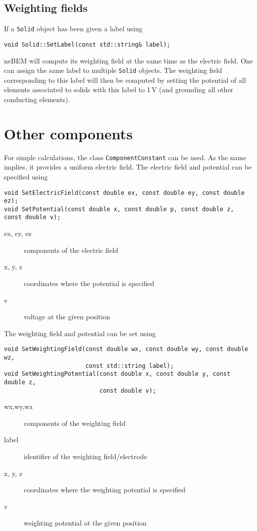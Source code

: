 \subsection{Weighting fields}
If a \texttt{Solid} object has been given a label using 
\begin{lstlisting}
void Solid::SetLabel(const std::string& label);
\end{lstlisting}
neBEM will compute its weighting field at the same time as 
the electric field.
One can assign the same label to multiple \texttt{Solid} objects.
The weighting field corresponding to this label will then be 
computed by setting the potential of all elements associated to solids 
with this label to 1\,V (and grounding all other conducting elements).

\section{Other components}
For simple calculations, the class \texttt{ComponentConstant} can be used. 
As the name implies, it provides a uniform electric field. 
The electric field and potential can be specified using
\begin{lstlisting}
void SetElectricField(const double ex, const double ey, const double ez);
void SetPotential(const double x, const double p, const double z, const double v);
\end{lstlisting}
\begin{description}
  \item[ex, ey, ez]
  components of the electric field
  \item[x, y, z]
  coordinates where the potential is specified
  \item[v]
  voltage at the given position
\end{description}
The weighting field and potential can be set using
\begin{lstlisting}
void SetWeightingField(const double wx, const double wy, const double wz,
                       const std::string label);
void SetWeightingPotential(const double x, const double y, const double z,
                           const double v);
\end{lstlisting}
\begin{description}
  \item[wx,wy,wz] components of the weighting field
  \item[label] identifier of the weighting field/electrode
  \item[x, y, z] coordinates where the weighting potential is specified
  \item[v] weighting potential at the given position 
\end{description}

